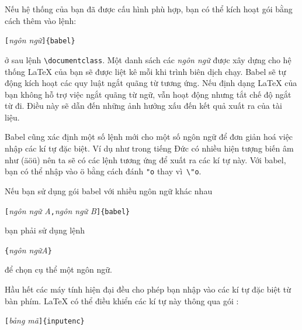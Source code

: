 Nếu hệ thống của bạn đã được cấu hình phù hợp, bạn có thể kích
hoạt gói  bằng cách thêm vào lệnh:

\begin{lscommand}
\verb|[|\emph{ngôn ngữ}\verb|]{babel}|
\end{lscommand}
\noindent ở sau lệnh \verb|\documentclass|. Một danh sách các \emph{ngôn ngữ} được xây dựng cho hệ thống \LaTeX{} của bạn sẽ được liệt kê mỗi khi trình biên dịch chạy. Babel sẽ tự động kích hoạt các quy luật ngắt quãng từ tương ứng. Nếu định dạng \LaTeX{} của bạn không hỗ trợ việc ngắt quãng từ ngữ,  vẫn hoạt động nhưng tắt chế độ ngắt từ đi. Điều này sẽ dẫn đến những ảnh hưởng xấu đến kết quả xuất ra của tài liệu.

\textsf{Babel} cũng xác định một số lệnh mới cho một số ngôn ngữ để đơn giản hoá việc nhập các kí tự đặc biệt. Ví dụ như trong tiếng Đức có nhiều hiện tượng biến âm như (\"a\"o\"u) nên ta sẽ có các lệnh tương ứng để xuất ra các kí tự này. Với \textsf{babel}, bạn có thể nhập vào \"o bằng cách đánh \verb|"o| thay vì~\verb|\"o|.

Nếu bạn sử dụng gói babel với nhiều ngôn ngữ khác nhau
\begin{lscommand}
\verb|[|\emph{ngôn ngữ A}\verb|,|\emph{ngôn ngữ B}\verb|]{babel}|
\end{lscommand}
\noindent bạn phải sử dụng lệnh
\begin{lscommand}
\verb|{|\emph{ngôn ngữA}\verb|}|
\end{lscommand}
\noindent để chọn cụ thể một ngôn ngữ.

Hầu hết các máy tính hiện đại đều cho phép bạn nhập vào các kí tự đặc biệt từ bàn phím. \LaTeX{} có thể điều khiển các kí tự này thông qua gói :
\begin{lscommand}
\verb|[|\emph{bảng mã}\verb|]{inputenc}|
\end{lscommand}

